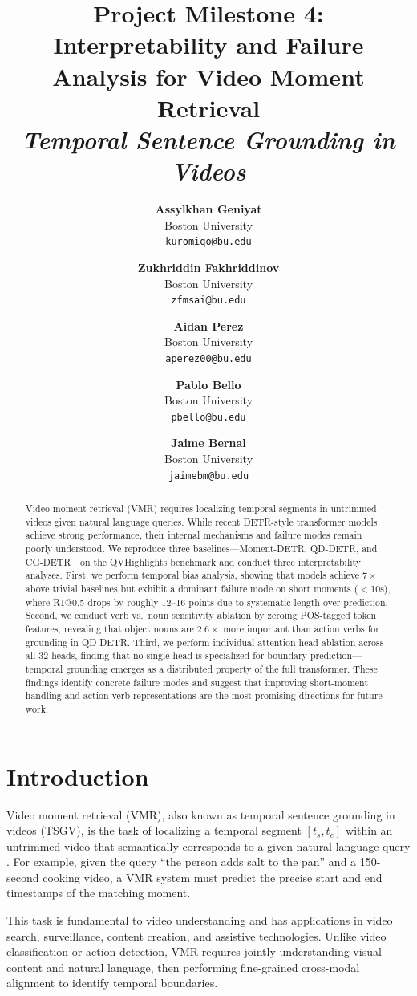 \documentclass[10pt,twocolumn]{article}
\title{\textbf{Project Milestone 4: Interpretability and Failure Analysis for Video Moment Retrieval} \\ \textit{Temporal Sentence Grounding in Videos}}
\author{
  \begin{tabular}[t]{c}\textbf{Assylkhan Geniyat} \\ Boston University \\ \texttt{kuromiqo@bu.edu}\end{tabular} \and
  \begin{tabular}[t]{c}\textbf{Zukhriddin Fakhriddinov} \\ Boston University \\ \texttt{zfmsai@bu.edu}\end{tabular} \and
  \begin{tabular}[t]{c}\textbf{Aidan Perez} \\ Boston University \\ \texttt{aperez00@bu.edu}\end{tabular} \and
  \begin{tabular}[t]{c}\textbf{Pablo Bello} \\ Boston University \\ \texttt{pbello@bu.edu}\end{tabular} \and
  \begin{tabular}[t]{c}\textbf{Jaime Bernal} \\ Boston University \\ \texttt{jaimebm@bu.edu}\end{tabular}
}
\date{}
\begin{document}
\maketitle

\begin{abstract}
Video moment retrieval (VMR) requires localizing temporal segments in untrimmed videos given natural language queries. While recent DETR-style transformer models achieve strong performance, their internal mechanisms and failure modes remain poorly understood. We reproduce three baselines---Moment-DETR, QD-DETR, and CG-DETR---on the QVHighlights benchmark and conduct three interpretability analyses. First, we perform temporal bias analysis, showing that models achieve $7\times$ above trivial baselines but exhibit a dominant failure mode on short moments ($<$10s), where R1@0.5 drops by roughly 12--16 points due to systematic length over-prediction. Second, we conduct verb vs.\ noun sensitivity ablation by zeroing POS-tagged token features, revealing that object nouns are $2.6\times$ more important than action verbs for grounding in QD-DETR. Third, we perform individual attention head ablation across all 32 heads, finding that no single head is specialized for boundary prediction---temporal grounding emerges as a distributed property of the full transformer. These findings identify concrete failure modes and suggest that improving short-moment handling and action-verb representations are the most promising directions for future work.
\end{abstract}

\section{Introduction}
\label{sec:intro}

Video moment retrieval (VMR), also known as temporal sentence grounding in videos (TSGV), is the task of localizing a temporal segment $[t_s, t_e]$ within an untrimmed video that semantically corresponds to a given natural language query \citep{gao2017tall}. For example, given the query ``the person adds salt to the pan'' and a 150-second cooking video, a VMR system must predict the precise start and end timestamps of the matching moment.

This task is fundamental to video understanding and has applications in video search, surveillance, content creation, and assistive technologies. Unlike video classification or action detection, VMR requires jointly understanding visual content and natural language, then performing fine-grained cross-modal alignment to identify temporal boundaries.
\end{document}
